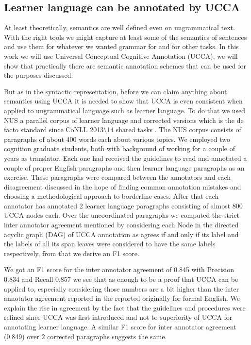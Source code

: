 \documentclass[11pt]{article}
\begin{document}
\subsection{Learner language can be annotated by UCCA}

At least theoretically, semantics are well defined even on ungrammatical
text. With the right tools we might capture at least some of the semantics
of sentences and use them for whatever we wanted grammar for and for
other tasks. In this work we will use Universal Conceptual Cognitive
Annotation (UCCA)\cite{abend2013universal}, we will show that practically
there are semantic annotation schemes that can be used for the purposes
discussed.

But as in the syntactic representation, before we can claim anything
about semantics using UCCA it is needed to show that UCCA is even
consistent when applied to ungrammatical language such as learner
language. To do that we used NUS\cite{dahlmeier2013building} a parallel
corpus of learner language and corrected versions which is the de
facto standard since CoNLL 2013\textbackslash{}14 shared tasks \cite{kao2013conll,ng2014conll}.
The NUS corpus consists of paragraphs of about 400 words each about
various topics. We employed two cognition graduate students, both
with background of working for a couple of years as translator. Each
one had received the guidelines to read and annotated a couple of
proper English paragraphs and then learner language paragraphs as
an exercise. These paragraphs were compared between the annotators
and each disagreement discussed in the hope of finding common annotation
mistakes and choosing a methodological approach to borderline cases.
After that each annotator has annotated 2 learner language paragraphs
consisting of almost 800 UCCA nodes each. Over the uncoordinated paragraphs
we computed the strict inter annotator agreement mentioned by \cite{abend2013universal}
considering each Node in the directed acyclic graph (DAG) of UCCA
annotation as agrees if and only if its label and the labels of all
its span leaves were considered to have the same labels respectively,
from that we derive an F1 score. 

We got an F1 score for the inter annotator agreement of 0.845 with
Precision 0.834 and Recall 0.857 we see that as enough to be a proof
that UCCA can be applied to, especially considering those numbers
are a bit higher than the inter annotator agreement reported in the
reported originally for formal English\cite{abend2013universal}.
We explain the rise in agreement by the fact that the guidelines and
procedures were refined since UCCA was first introduced and not to
superiority of UCCA for annotating learner language. A similar F1
score for inter annotator agreement (0.849) over 2 corrected paragraphs
suggests the same.
\end{document}
